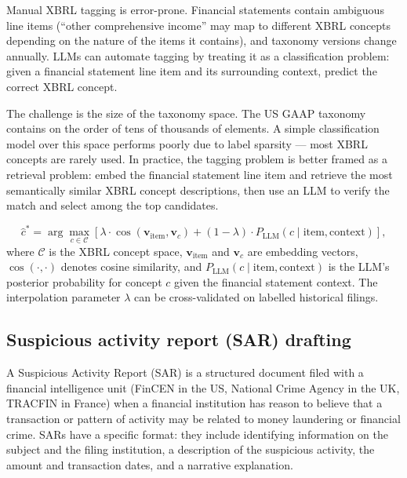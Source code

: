 Manual XBRL tagging is error-prone. Financial statements contain ambiguous line items (``other comprehensive income'' may map to different XBRL concepts depending on the nature of the items it contains), and taxonomy versions change annually. LLMs can automate tagging by treating it as a classification problem: given a financial statement line item and its surrounding context, predict the correct XBRL concept.

The challenge is the size of the taxonomy space. The US GAAP taxonomy contains on the order of tens of thousands of elements. A simple classification model over this space performs poorly due to label sparsity --- most XBRL concepts are rarely used. In practice, the tagging problem is better framed as a retrieval problem: embed the financial statement line item and retrieve the most semantically similar XBRL concept descriptions, then use an LLM to verify the match and select among the top candidates.

\begin{equation}
\label{eq:xbrl-retrieval-score}
\hat{c}^* = \arg\max_{c \in \mathcal{C}} \left[ \lambda \cdot \cos(\mathbf{v}_{\text{item}}, \mathbf{v}_c) + (1-\lambda) \cdot P_{\text{LLM}}(c \mid \text{item}, \text{context}) \right],
\end{equation}
where $\mathcal{C}$ is the XBRL concept space, $\mathbf{v}_{\text{item}}$ and $\mathbf{v}_c$ are embedding vectors, $\cos(\cdot, \cdot)$ denotes cosine similarity, and $P_{\text{LLM}}(c \mid \text{item}, \text{context})$ is the LLM's posterior probability for concept $c$ given the financial statement context. The interpolation parameter $\lambda$ can be cross-validated on labelled historical filings.

\subsection{Suspicious activity report (SAR) drafting}
\label{sec:ch11-sar-drafting}

A Suspicious Activity Report (SAR) is a structured document filed with a financial intelligence unit (FinCEN in the US, National Crime Agency in the UK, TRACFIN in France) when a financial institution has reason to believe that a transaction or pattern of activity may be related to money laundering or financial crime. SARs have a specific format: they include identifying information on the subject and the filing institution, a description of the suspicious activity, the amount and transaction dates, and a narrative explanation.

